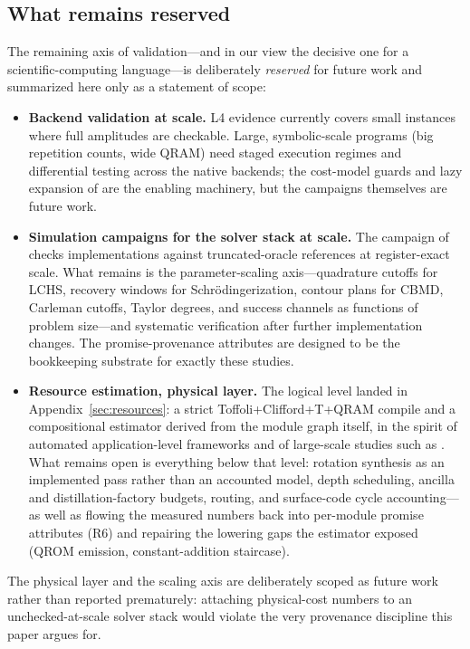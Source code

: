 \subsection{What remains reserved}
\label{sec:reserved}

The remaining axis of validation---and in our view the decisive one for a
scientific-computing language---is deliberately \emph{reserved} for future
work and summarized here only as a statement of scope:

\begin{itemize}
\item \textbf{Backend validation at scale.}  L4 evidence currently covers
  small instances where full amplitudes are checkable.  Large, symbolic-scale
  programs (big repetition counts, wide QRAM) need staged execution regimes
  and differential testing across the native backends; the cost-model guards
  and lazy expansion of  are the enabling machinery, but the
  campaigns themselves are future work.
\item \textbf{Simulation campaigns for the solver stack at scale.}  The
  campaign of  checks implementations against
  truncated-oracle references at register-exact scale.  What remains is the
  parameter-scaling axis---quadrature cutoffs for LCHS, recovery windows
  for Schr\"odingerization, contour plans for CBMD, Carleman cutoffs,
  Taylor degrees, and success channels as functions of problem size---and
  systematic verification after further implementation changes.  The promise-provenance
  attributes are designed to be the bookkeeping substrate for exactly these
  studies.
\item \textbf{Resource estimation, physical layer.}  The logical level
  landed in Appendix~\ref{sec:resources}: a strict Toffoli+Clifford+T+QRAM
  compile and a compositional estimator derived from the module graph
  itself, in the spirit of automated application-level frameworks
  \cite{beverland2022assessing,harrigan2024qualtran,su2026resource} and of
  large-scale studies such as \cite{gidney2021factor,gidney2025rsa}.  What
  remains open is everything below that level: rotation synthesis as an
  implemented pass rather than an accounted model, depth scheduling,
  ancilla and distillation-factory budgets, routing, and surface-code cycle
  accounting---as well as flowing the measured numbers back into per-module
  promise attributes (R6) and repairing the lowering gaps the estimator
  exposed (QROM emission, constant-addition staircase).
\end{itemize}

\noindent The physical layer and the scaling axis are deliberately scoped
as future work rather than reported prematurely: attaching physical-cost
numbers to an unchecked-at-scale solver stack would violate the very
provenance discipline this paper argues for.
